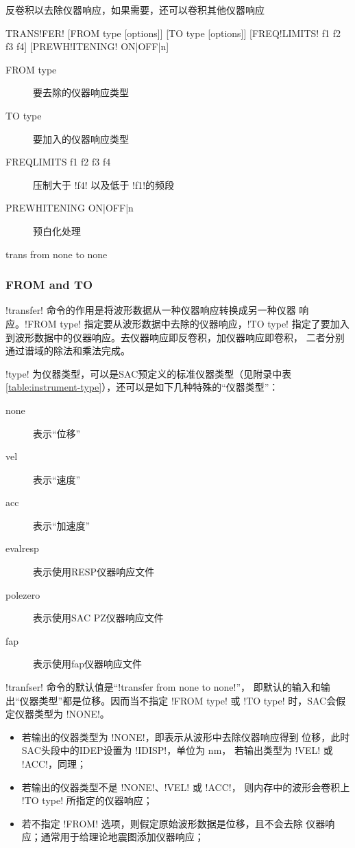 \label{cmd:transfer}

反卷积以去除仪器响应，如果需要，还可以卷积其他仪器响应

\begin{SACSTX}
TRANS!FER! [FROM type [options]] [TO type [options]] [FREQ!LIMITS! f1 f2 f3 f4]
    [PREWH!ITENING! ON|OFF|n]
\end{SACSTX}

\begin{description}
\item [FROM type] 要去除的仪器响应类型
\item [TO type] 要加入的仪器响应类型
\item [FREQLIMITS f1 f2 f3 f4] 压制大于 !f4! 以及低于 !f1!的频段
\item [PREWHITENING ON|OFF|n] 预白化处理
\end{description}

\begin{SACDFT}
trans from none to none
\end{SACDFT}

\subsubsection{FROM and TO}
!transfer! 命令的作用是将波形数据从一种仪器响应转换成另一种仪器
响应。!FROM type! 指定要从波形数据中去除的仪器响应，!TO type!
指定了要加入到波形数据中的仪器响应。去仪器响应即反卷积，加仪器响应即卷积，
二者分别通过谱域的除法和乘法完成。

!type! 为仪器类型，可以是SAC预定义的标准仪器类型（见附录中表
\ref{table:instrument-type}），还可以是如下几种特殊的``仪器类型''：
\begin{description}
\item [none] 表示``位移''
\item [vel] 表示``速度''
\item [acc] 表示``加速度''
\item [evalresp] 表示使用RESP仪器响应文件
\item [polezero] 表示使用SAC PZ仪器响应文件
\item [fap] 表示使用fap仪器响应文件
\end{description}

!tranfser! 命令的默认值是``!transfer from none to none!''，
即默认的输入和输出``仪器类型''都是位移。因而当不指定 !FROM type!
或 !TO type! 时，SAC会假定仪器类型为 !NONE!。

\begin{itemize}
\item 若输出的仪器类型为 !NONE!，即表示从波形中去除仪器响应得到
    位移，此时SAC头段中的IDEP设置为 !IDISP!，单位为 \si{nm}，
    若输出类型为 !VEL! 或 !ACC!，同理；
\item 若输出的仪器类型不是 !NONE!、!VEL! 或 !ACC!，
    则内存中的波形会卷积上 !TO type! 所指定的仪器响应；
\item 若不指定 !FROM! 选项，则假定原始波形数据是位移，且不会去除
    仪器响应；通常用于给理论地震图添加仪器响应；
\end{itemize}

